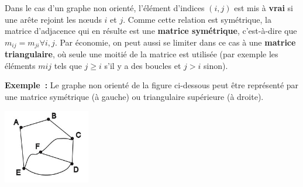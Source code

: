 			Dans le cas d'un graphe non orienté, l'élément d'indices $(i, j)$ 
			est mis à \textbf{vrai} si une arête rejoint les n{\oe}uds $i$ et $j$. 
			Comme cette relation est symétrique, la matrice d'adjacence qui en
			résulte est une \textbf{matrice symétrique}, c'est-à-dire que 
			$m_{ij} = m_{ji} \forall{i, j}$. Par économie, on peut aussi se limiter 
			dans ce cas à une \textbf{matrice triangulaire}, où seule une moitié 
			de la matrice est utilisée (par exemple les éléments $m{ij}$ 
			tels que $j \geq i$ s'il y a des boucles et $j > i$ sinon).

			\textbf{Exemple~:} Le graphe non orienté de la figure ci-dessous 
			peut être représenté par une matrice symétrique (à gauche) ou
			triangulaire supérieure (à droite).

			\begin{center}
			\includegraphics[width=3.784cm,height=3.233cm]{image/a2012Logique2eme-img050.jpg}
			\end{center}

